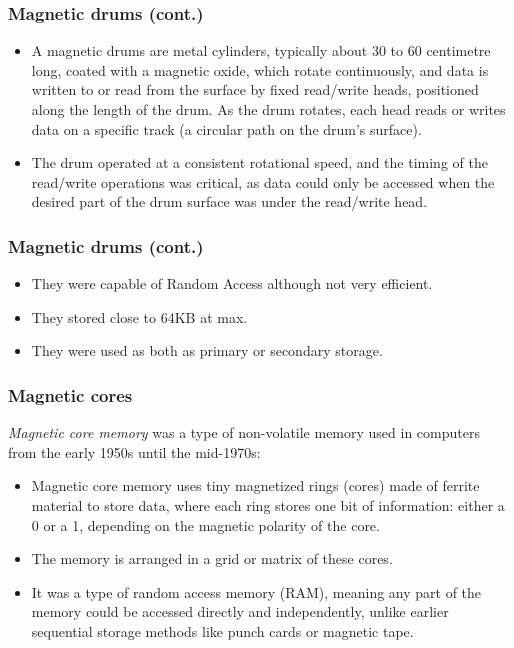 \documentclass[aspectratio=169]{beamer}
\begin{document}
\begin{frame}
  \frametitle{Magnetic drums (cont.)}
  \begin{itemize}
    \item A magnetic drums are metal cylinders, typically about 30 to 60 centimetre long, coated with a magnetic oxide, which rotate continuously, and data is written to or read from the surface by fixed read/write heads, positioned along the length of the drum. As the drum rotates, each head reads or writes data on a specific track (a circular path on the drum's surface). \pause
    \item The drum operated at a consistent rotational speed, and the timing of the read/write operations was critical, as data could only be accessed when the desired part of the drum surface was under the read/write head.
  \end{itemize}
\end{frame}

\begin{frame}
  \frametitle{Magnetic drums (cont.)}
  \begin{itemize}
    \item They were capable of Random Access although not very efficient. \pause 
    \item They stored close to 64KB at max. \pause
    \item They were used as both as primary or secondary storage.
  \end{itemize}
\end{frame}

\begin{frame}
  \frametitle{Magnetic cores}
  \textit{Magnetic core memory} was a type of non-volatile memory used in computers from the early 1950s until the mid-1970s: \pause
  \begin{itemize}
    \item Magnetic core memory uses tiny magnetized rings (cores) made of ferrite material to store data, where each ring stores one bit of information: either a 0 or a 1, depending on the magnetic polarity of the core. \pause
    \item The memory is arranged in a grid or matrix of these cores. \pause
    \item It was a type of random access memory (RAM), meaning any part of the memory could be accessed directly and independently, unlike earlier sequential storage methods like punch cards or magnetic tape.
  \end{itemize}
\end{frame}
\end{document}
